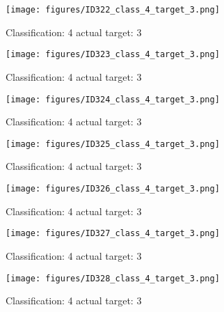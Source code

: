 \begin{figure}[h!]
\begin{center}
\texttt{[image: figures/ID322\_class\_4\_target\_3.png]}
\end{center}
\caption{ Classification: 4 actual target: 3}
\label{fig:ID322_class_4_target_3}
\end{figure}
\begin{figure}[h!]
\begin{center}
\texttt{[image: figures/ID323\_class\_4\_target\_3.png]}
\end{center}
\caption{ Classification: 4 actual target: 3}
\label{fig:ID323_class_4_target_3}
\end{figure}
\begin{figure}[h!]
\begin{center}
\texttt{[image: figures/ID324\_class\_4\_target\_3.png]}
\end{center}
\caption{ Classification: 4 actual target: 3}
\label{fig:ID324_class_4_target_3}
\end{figure}
\begin{figure}[h!]
\begin{center}
\texttt{[image: figures/ID325\_class\_4\_target\_3.png]}
\end{center}
\caption{ Classification: 4 actual target: 3}
\label{fig:ID325_class_4_target_3}
\end{figure}
\begin{figure}[h!]
\begin{center}
\texttt{[image: figures/ID326\_class\_4\_target\_3.png]}
\end{center}
\caption{ Classification: 4 actual target: 3}
\label{fig:ID326_class_4_target_3}
\end{figure}
\begin{figure}[h!]
\begin{center}
\texttt{[image: figures/ID327\_class\_4\_target\_3.png]}
\end{center}
\caption{ Classification: 4 actual target: 3}
\label{fig:ID327_class_4_target_3}
\end{figure}
\begin{figure}[h!]
\begin{center}
\texttt{[image: figures/ID328\_class\_4\_target\_3.png]}
\end{center}
\caption{ Classification: 4 actual target: 3}
\label{fig:ID328_class_4_target_3}
\end{figure}
